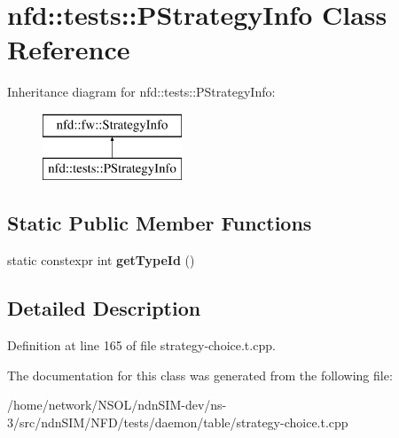 \hypertarget{classnfd_1_1tests_1_1PStrategyInfo}{}\section{nfd\+:\+:tests\+:\+:P\+Strategy\+Info Class Reference}
\label{classnfd_1_1tests_1_1PStrategyInfo}
Inheritance diagram for nfd\+:\+:tests\+:\+:P\+Strategy\+Info\+:\begin{figure}[H]
\begin{center}
\leavevmode
\includegraphics[height=2.000000cm]{classnfd_1_1tests_1_1PStrategyInfo}
\end{center}
\end{figure}
\subsection*{Static Public Member Functions}
\begin{DoxyCompactItemize}
\item 
static constexpr int {\bfseries get\+Type\+Id} ()\hypertarget{classnfd_1_1tests_1_1PStrategyInfo_a3aabaff6c2b7872bbd2bc9c7526b4972}{}\label{classnfd_1_1tests_1_1PStrategyInfo_a3aabaff6c2b7872bbd2bc9c7526b4972}

\end{DoxyCompactItemize}


\subsection{Detailed Description}


Definition at line 165 of file strategy-\/choice.\+t.\+cpp.



The documentation for this class was generated from the following file\+:\begin{DoxyCompactItemize}
\item 
/home/network/\+N\+S\+O\+L/ndn\+S\+I\+M-\/dev/ns-\/3/src/ndn\+S\+I\+M/\+N\+F\+D/tests/daemon/table/strategy-\/choice.\+t.\+cpp\end{DoxyCompactItemize}
